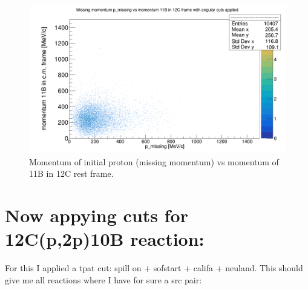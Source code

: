 \documentclass{report}
\begin{document}
\begin{figure}[hbt!]
  \includegraphics[width=\linewidth]{11b_mom_vs_missing_mom.png}
  \caption{Momentum of initial proton (missing momentum) vs momentum of 11B in 12C rest frame.}
  \label{fig:gamma_angular_and_mult_cut}
\end{figure}

\section{Now appying cuts for 12C(p,2p)10B reaction:}
For this I applied a tpat cut: spill on + sofstart + califa + neuland. This should give me all reactions where I have for sure a src pair:\newline
\end{document}
